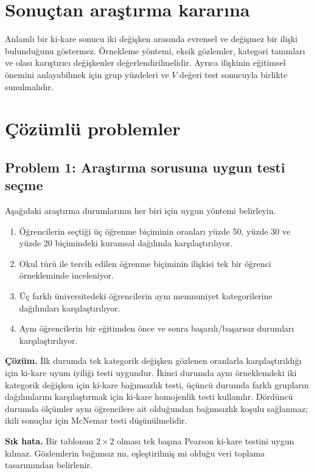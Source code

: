 \section{Sonuçtan araştırma kararına}

Anlamlı bir ki-kare sonucu iki değişken arasında evrensel ve değişmez bir
ilişki bulunduğunu göstermez. Örnekleme yöntemi, eksik gözlemler, kategori
tanımları ve olası karıştırıcı değişkenler değerlendirilmelidir. Ayrıca
ilişkinin eğitimsel önemini anlayabilmek için grup yüzdeleri ve $V$ değeri
test sonucuyla birlikte sunulmalıdır.

\section{Çözümlü problemler}

\subsection*{Problem 1: Araştırma sorusuna uygun testi seçme}

Aşağıdaki araştırma durumlarının her biri için uygun yöntemi belirleyin.

\begin{enumerate}[label=\alph*)]
  \item Öğrencilerin seçtiği üç öğrenme biçiminin oranları yüzde 50, yüzde 30
  ve yüzde 20 biçimindeki kuramsal dağılımla karşılaştırılıyor.
  \item Okul türü ile tercih edilen öğrenme biçiminin ilişkisi tek bir öğrenci
  örnekleminde inceleniyor.
  \item Üç farklı üniversitedeki öğrencilerin aynı memnuniyet kategorilerine
  dağılımları karşılaştırılıyor.
  \item Aynı öğrencilerin bir eğitimden önce ve sonra başarılı/başarısız
  durumları karşılaştırılıyor.
\end{enumerate}


\textbf{Çözüm.} İlk durumda tek kategorik değişken gözlenen oranlarla
karşılaştırıldığı için ki-kare uyum iyiliği testi uygundur. İkinci durumda
aynı örneklemdeki iki kategorik değişken için ki-kare bağımsızlık testi,
üçüncü durumda farklı grupların dağılımlarını karşılaştırmak için ki-kare
homojenlik testi kullanılır. Dördüncü durumda ölçümler aynı öğrencilere ait
olduğundan bağımsızlık koşulu sağlanmaz; ikili sonuçlar için McNemar testi
düşünülmelidir.

\textbf{Sık hata.} Bir tablonun $2\times2$ olması tek başına Pearson ki-kare
testini uygun kılmaz. Gözlemlerin bağımsız mı, eşleştirilmiş mi olduğu veri
toplama tasarımından belirlenir.

